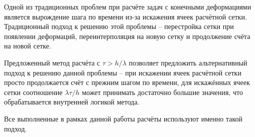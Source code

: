 Одной из традиционных проблем при расчёте задач с конечными деформациями является вырождение шага по времени из-за искажения ячеек расчётной сетки. Традиционный подход к решению этой проблемы -- перестройка сетки при появлении деформаций, переинтерполяция на новую сетку и продолжение счёта на новой сетке.

Предложенный метод расчёта с $\tau > h / \lambda$ позволяет предложить альтернативный подход к решению данной проблемы -- при искажении ячеек расчётной сетки просто продолжается счёт с прежним шагом по времени, для искажённых ячеек сетки соотношение $\lambda \tau / h$ может принимать достаточно большие значения, что обрабатывается внутренней логикой метода.

Все выполненные в рамках данной работы расчёты используют именно такой подход.

